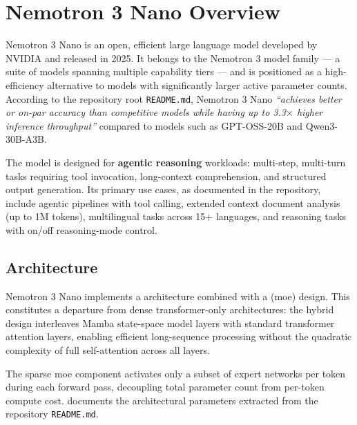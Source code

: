 
\section{Nemotron 3 Nano Overview}
\label{sec:nemotron-overview}

Nemotron 3 Nano is an open, efficient large language model developed by
NVIDIA and released in 2025. It belongs to the Nemotron 3 model family —
a suite of models spanning multiple capability tiers — and is positioned
as a high-efficiency alternative to models with significantly larger active
parameter counts. According to the repository root \texttt{README.md},
Nemotron 3 Nano \textit{``achieves better or on-par accuracy than competitive
models while having up to 3.3$\times$ higher inference throughput''} compared
to models such as GPT-OSS-20B and Qwen3-30B-A3B.

The model is designed for \textbf{agentic reasoning} workloads: multi-step,
multi-turn tasks requiring tool invocation, long-context comprehension, and
structured output generation. Its primary use cases, as documented in the
repository, include agentic pipelines with tool calling, extended context
document analysis (up to 1M tokens), multilingual tasks across 15+ languages,
and reasoning tasks with on/off reasoning-mode control.

\subsection{Architecture}
\label{subsec:nemotron-architecture}

Nemotron 3 Nano implements a  architecture
combined with a  (\acrshort{moe}) design.
This constitutes a departure from dense transformer-only architectures:
the hybrid design interleaves Mamba state-space model layers with standard
transformer attention layers, enabling efficient long-sequence processing
without the quadratic complexity of full self-attention across all layers.

The sparse \acrshort{moe} component activates only a subset of expert
networks per token during each forward pass, decoupling total parameter
count from per-token compute cost.  documents
the architectural parameters extracted from the repository
\texttt{README.md}.

